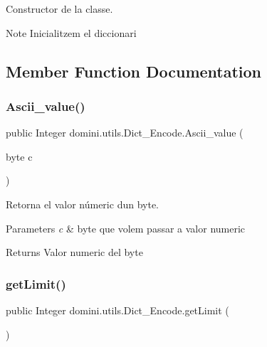Constructor de la classe. 

\begin{DoxyNote}{Note}
Inicialitzem el diccionari 
\end{DoxyNote}


\subsection{Member Function Documentation}
\mbox{\label{classdomini_1_1utils_1_1Dict__Encode_a12e23ecdd9b0078cb6e56c01126248b9}} 
\subsubsection{\texorpdfstring{Ascii\+\_\+value()}{Ascii\_value()}}
{\footnotesize\ttfamily public Integer domini.\+utils.\+Dict\+\_\+\+Encode.\+Ascii\+\_\+value (\begin{DoxyParamCaption}\item[{byte}]{c }\end{DoxyParamCaption})\hspace{0.3cm}{\ttfamily [inline]}}



Retorna el valor númeric d\textquotesingle{}un byte. 


\begin{DoxyParams}{Parameters}
{\em c} & byte que volem passar a valor numeric \\
\hline
\end{DoxyParams}
\begin{DoxyReturn}{Returns}
Valor numeric del byte 
\end{DoxyReturn}
\mbox{\label{classdomini_1_1utils_1_1Dict__Encode_a21a05b62b848a7ab9fbdf49a3a6e7edf}} 
\subsubsection{\texorpdfstring{get\+Limit()}{getLimit()}}
{\footnotesize\ttfamily public Integer domini.\+utils.\+Dict\+\_\+\+Encode.\+get\+Limit (\begin{DoxyParamCaption}{ }\end{DoxyParamCaption})\hspace{0.3cm}{\ttfamily [inline]}}

